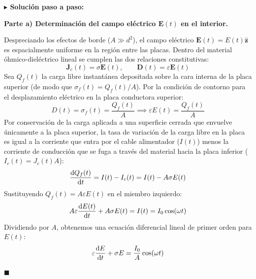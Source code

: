 \documentclass[11pt,a4paper]{book}
\newenvironment{solucion}{%
    \par\medskip\noindent\textbf{\color{blue!65!black}\Large $\blacktriangleright$ Solución paso a paso:}\par\medskip
}{%
    \hfill$\blacksquare$\par\bigskip
}
\newcommand{\zhat}{\hat{\bm{z}}}
\newcommand{\Evec}{\bm{E}}
\newcommand{\Dvec}{\bm{D}}
\newcommand{\Jvec}{\bm{J}}
\begin{document}
\begin{solucion}
\textbf{Parte a) Determinación del campo eléctrico $\Evec(t)$ en el interior.}

Despreciando los efectos de borde ($A \gg d^2$), el campo eléctrico $\Evec(t) = E(t)\zhat$ es espacialmente uniforme en la región entre las placas. Dentro del material óhmico-dieléctrico lineal se cumplen las dos relaciones constitutivas:
\begin{equation}
    \Jvec_c(t) = \sigma \Evec(t), \qquad \Dvec(t) = \varepsilon \Evec(t)
\end{equation}
Sea $Q_f(t)$ la carga libre instantánea depositada sobre la cara interna de la placa superior (de modo que $\sigma_f(t) = Q_f(t)/A$). Por la condición de contorno para el desplazamiento eléctrico en la placa conductora superior:
\begin{equation}
    D(t) = \sigma_f(t) = \frac{Q_f(t)}{A} \implies \varepsilon E(t) = \frac{Q_f(t)}{A}
\end{equation}
Por conservación de la carga aplicada a una superficie cerrada que envuelve únicamente a la placa superior, la tasa de variación de la carga libre en la placa es igual a la corriente que entra por el cable alimentador ($I(t)$) menos la corriente de conducción que se fuga a través del material hacia la placa inferior ($I_c(t) = J_c(t) A$):
\begin{equation}
    \dv{Q_f(t)}{t} = I(t) - I_c(t) = I(t) - A \sigma E(t)
\end{equation}
Sustituyendo $Q_f(t) = A \varepsilon E(t)$ en el miembro izquierdo:
\begin{equation}
    A \varepsilon \dv{E(t)}{t} + A \sigma E(t) = I(t) = I_0 \cos(\omega t)
\end{equation}
Dividiendo por $A$, obtenemos una ecuación diferencial lineal de primer orden para $E(t)$:
\begin{equation}
    \varepsilon \dv{E}{t} + \sigma E = \frac{I_0}{A} \cos(\omega t) \label{eq:edo_maxwell_disp}
\end{equation}


\end{solucion}
\end{document}
